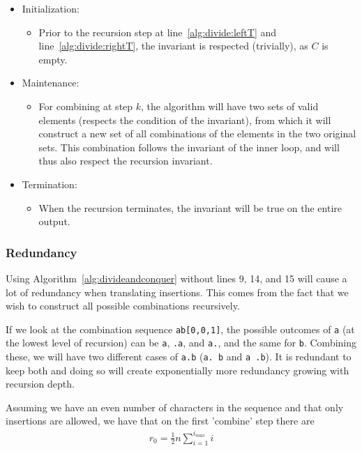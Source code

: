 \documentclass[12pt]{article}
\theoremstyle{definition}
\begin{document}
\begin{itemize}
\item Initialization:
\begin{itemize}
	\item[] Prior to the recursion step at line~\ref{alg:divide:leftT} and line~\ref{alg:divide:rightT}, the invariant is respected (trivially), as $C$ is empty.
\end{itemize}

\item Maintenance:
\begin{itemize}
	\item[] For combining at step $k$, the algorithm will have two sets of valid elements (respects the condition of the invariant), from which it will construct a new set of all combinations of the elements in the two original sets. This combination follows the invariant of the inner loop, and will thus also respect the recursion invariant.
\end{itemize}

\item Termination:
\begin{itemize}
	\item[] When the recursion terminates, the invariant will be true on the entire output.
\end{itemize}
\end{itemize}


\subsubsection{Redundancy}

Using Algorithm~\ref{alg:divideandconquer} without lines 9, 14, and 15 will cause a lot of redundancy when translating insertions. This comes from the fact that we wish to construct all possible combinations recursively.

If we look at the combination sequence \texttt{ab[0,0,1]}, the possible outcomes of \texttt{a} (at the lowest level of recursion) can be \texttt{a}, \texttt{.a}, and \texttt{a.}, and the same for \texttt{b}. Combining these, we will have two different cases of \texttt{a.b} (\texttt{a. b} and \texttt{a .b}). It is redundant to keep both and doing so will create exponentially more redundancy growing with recursion depth.

Assuming we have an even number of characters in the sequence and that only insertions are allowed, we have that on the first 'combine' step there are
\begin{eqnarray}
	\label{r_0}
	r_0 = \frac{1}{2}n\sum^{i_{max}}_{i=1} i
\end{eqnarray}
\end{document}

